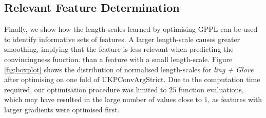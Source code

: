 
\subsection{Relevant Feature Determination}

Finally, we show how the length-scales learned by optimising GPPL can be used to identify
informative sets of features. 
A larger length-scale causes greater smoothing, 
implying that the feature is less relevant when predicting the convincingness function.
than a feature with a small length-scale. 
Figure \ref{fig:boxplot} shows the distribution of normalised length-scales for \emph{ling + Glove}
after optimising on one fold of UKPConvArgStrict. 
Due to the computation time required, our optimisation procedure was limited to $25$ function evaluations,
which may have resulted in the large number of values close to $1$,
as features with larger gradients were optimised first.

